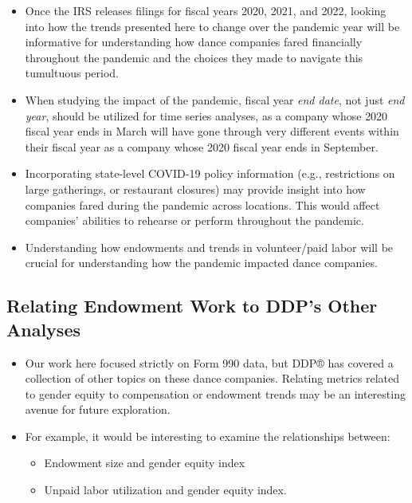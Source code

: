 \documentclass[Dance Data
Project,article,submit,moreauthors,pdftex]{mdpi}
\providecommand{\tightlist}{%
  \setlength{\itemsep}{0pt}\setlength{\parskip}{0pt}}
\begin{document}
\begin{itemize}
\tightlist
\item
  Once the IRS releases filings for fiscal years 2020, 2021, and 2022,
  looking into how the trends presented here to change over the pandemic
  year will be informative for understanding how dance companies fared
  financially throughout the pandemic and the choices they made to
  navigate this tumultuous period.\\
\item
  When studying the impact of the pandemic, fiscal year \emph{end date},
  not just \emph{end year}, should be utilized for time series analyses,
  as a company whose 2020 fiscal year ends in March will have gone
  through very different events within their fiscal year as a company
  whose 2020 fiscal year ends in September.\\
\item
  Incorporating state-level COVID-19 policy information (e.g.,
  restrictions on large gatherings, or restaurant closures) may provide
  insight into how companies fared during the pandemic across locations.
  This would affect companies' abilities to rehearse or perform
  throughout the pandemic.
\item
  Understanding how endowments and trends in volunteer/paid labor will
  be crucial for understanding how the pandemic impacted dance
  companies.
\end{itemize}

\hypertarget{relating-endowment-work-to-ddps-other-analyses}{%
\subsection{Relating Endowment Work to DDP's Other
Analyses}\label{relating-endowment-work-to-ddps-other-analyses}}

\begin{itemize}
\tightlist
\item
  Our work here focused strictly on Form 990 data, but DDP® has covered
  a collection of other topics on these dance companies. Relating
  metrics related to gender equity to compensation or endowment trends
  may be an interesting avenue for future exploration.\\
\item
  For example, it would be interesting to examine the relationships
  between:

  \begin{itemize}
  \tightlist
  \item
    Endowment size and gender equity index
  \item
    Unpaid labor utilization and gender equity index.
  \end{itemize}
\end{itemize}
\end{document}
